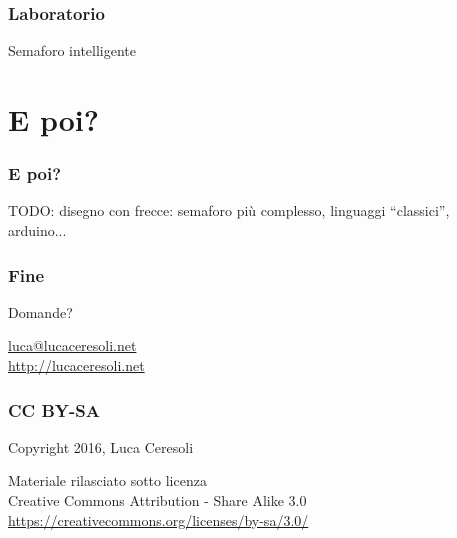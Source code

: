 \documentclass[xetex,table]{beamer}
\begin{document}
\begin{frame}
\frametitle[Lab! Semaforo intelligente!]{Laboratorio}
  \begin{center}
    \LARGE
    Semaforo intelligente
  \end{center}
\end{frame}

\section{E poi?}

\begin{frame}
  \frametitle{E poi?}
  TODO: disegno con frecce: semaforo più complesso, linguaggi ``classici'', arduino...
\end{frame}

\begin{frame}
  \frametitle{Fine}

  \begin{center}
    {\Huge Domande?}

    \vspace{0.1\textheight}

    \href{mailto:luca@lucaceresoli.net}{luca@lucaceresoli.net}\\
    \url{http://lucaceresoli.net}
  \end{center}
\end{frame}

\begin{frame}
  \frametitle{CC BY-SA}
  \begin{center}
    \textcopyright{} Copyright 2016, Luca Ceresoli\\

    \vspace{0.05\textheight}

    \small
    Materiale rilasciato sotto licenza\\
    Creative Commons Attribution - Share Alike 3.0 \\
    \url{https://creativecommons.org/licenses/by-sa/3.0/} \\
  \end{center}
\end{frame}
\end{document}
